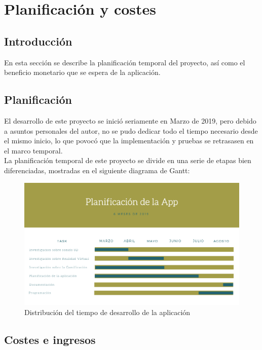 \section{Planificación y costes}

\subsection{Introducción}
 
\quad En esta sección se describe la planificación temporal del proyecto, así como el beneficio monetario que se espera de la aplicación.\\

\subsection{Planificación}

\quad El desarrollo de este proyecto se inició seriamente en Marzo de 2019, pero debido a asuntos personales del autor, no se pudo dedicar todo el tiempo necesario desde el mismo inicio, lo que povocó que la implementación y pruebas se retrasasen en el marco temporal.\\

\quad La planificación temporal de este proyecto se divide en una serie de etapas bien diferenciadas, mostradas en el siguiente diagrama de Gantt:\\

\begin{figure}[htb]
	\centering
	\includegraphics[width=1\textwidth]{./imagenes/diagramaGantt}
	\caption{Distribución del tiempo de desarrollo de la aplicación}
\end{figure}

\subsection{Costes e ingresos}

